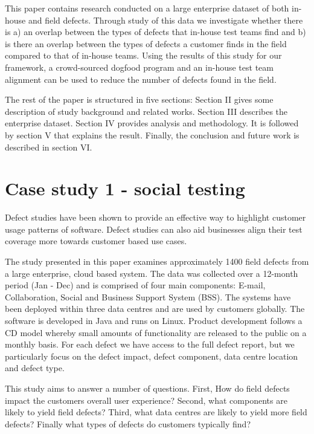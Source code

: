This paper contains research conducted on a large enterprise dataset of both in-house and field defects. Through study of this data we investigate whether there is a) an overlap between the types of defects that in-house test teams find and b) is there an overlap between the types of defects a customer finds in the field compared to that of in-house teams. Using the results of this study for our framework, a crowd-sourced dogfood program and an in-house test team alignment can be used to reduce the number of defects found in the field. \par 

The rest of the paper is structured in five sections: Section II gives some description of study background and related works. Section III describes the enterprise dataset. Section IV provides analysis and methodology. It is followed by section V that explains the result. Finally, the conclusion and future work is described in section VI. \par


\section{Case study 1 - social testing}

Defect studies have been shown to provide an effective way to highlight customer usage patterns of software. Defect studies can also aid businesses align their test coverage more towards customer based use cases. \par
The study presented in this paper examines approximately 1400 field defects from a large enterprise, cloud based system. The data was collected over a 12-month period (Jan - Dec) and is comprised of four main components: E-mail, Collaboration, Social and Business Support System (BSS). The systems have been deployed within three data centres and are used by customers globally. The software is developed in Java and runs on Linux. Product development follows a CD model whereby small amounts of functionality are released to the public on a monthly basis.  For each defect we have access to the full defect report, but we particularly focus on the defect impact, defect component, data centre location and defect type. 

This study aims to answer a number of questions. First, How do field defects impact the customers overall user experience? Second, what components are likely to yield field defects? Third, what data centres are likely to yield more field defects? Finally what types of defects do customers typically find?

